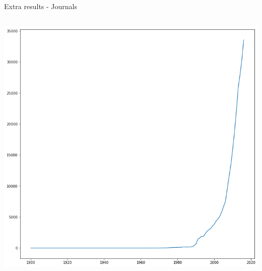 \documentclass[9pt]{beamer}
\begin{document}
\begin{frame}{Extra results - Journals}
\begin{columns}
\begin{column}{0.45\linewidth}
\begin{center}
		\includegraphics[width=0.9\linewidth]{../plots/journals/n_journals.png}
		\end{center}
	\end{column}
\end{columns}

\end{frame}
\end{document}
